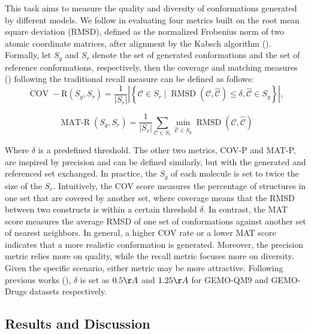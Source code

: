 \documentclass{article} %
\begin{document}
This task aims to measure the quality and diversity of conformations generated by different models. We follow \cite{ganea2021geomol} in evaluating four metrics built on the root mean square deviation (RMSD), defined as the normalized Frobenius norm of two atomic coordinate matrices, after alignment by the Kabsch algorithm (\cite{kabsch1976solution}). Formally, let $S_g$ and $S_r$ denote the set of generated conformations and the set of reference conformations, respectively, then the coverage and matching measures (\cite{xu2021learning}) following the traditional recall measure can be defined as follows:
\begin{equation}
	\operatorname{COV}-\mathrm{R}\left(S_g, S_r\right)=\frac{1}{\left|S_r\right|}\left|\left\{\mathcal{C} \in S_r \mid \operatorname{RMSD}(\mathcal{C}, \hat{\mathcal{C}}) \leq \delta, \hat{\mathcal{C}} \in S_g\right\}\right|,
\end{equation}

\begin{equation}
	\operatorname{MAT-R}\left(S_g, S_r\right)=\frac{1}{\left|S_r\right|} \sum_{\mathcal{C} \in S_r} \min _{\hat{\mathcal{C}} \in S_g} \operatorname{RMSD}(\mathcal{C}, \hat{\mathcal{C}})
\end{equation}

Where $\delta$ is a predefined threshold. The other two metrics, COV-P and MAT-P, are inspired by precision and can be defined similarly, but with the generated and referenced set exchanged. In practice, the $S_g$ of each molecule is set to twice the size of the $S_r$. Intuitively, the COV score measures the percentage of structures in one set that are covered by another set, where coverage means that the RMSD between two constructs is within a certain threshold $\delta$. In contrast, the MAT score measures the average RMSD of one set of conformations against another set of nearest neighbors. In general, a higher COV rate or a lower MAT score indicates that a more realistic conformation is generated. Moreover, the precision metric relies more on quality, while the recall metric focuses more on diversity. Given the specific scenario, either metric may be more attractive. 
Following previous works (\cite{xu2021learning, ganea2021geomol}), $\delta$ is set as $0.5 \AA$ and $1.25 \AA$ for GEMO-QM9 and GEMO-Drugs datasets respectively.



\subsection{Results and Discussion}
\end{document}
